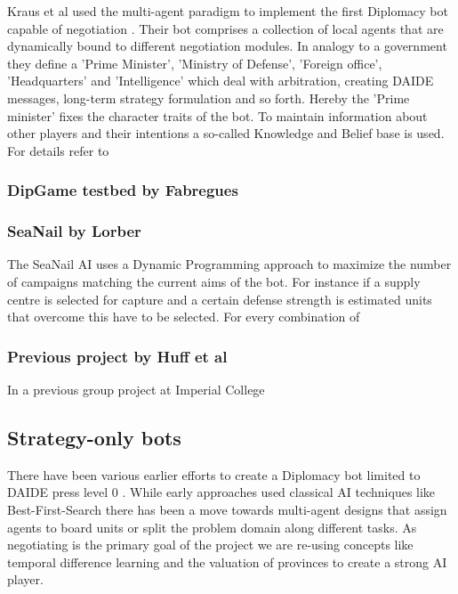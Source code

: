 \documentclass[11pt]{article} \usepackage{fullpage} \usepackage{cite}
\begin{document}
Kraus et al used the multi-agent paradigm to implement the first Diplomacy bot
capable of negotiation \cite{Kraus95}. Their bot comprises a collection of local
agents that are dynamically bound to different negotiation modules. In analogy
to a government they define a 'Prime Minister', 'Ministry of Defense', 'Foreign
office', 'Headquarters' and 'Intelligence' which deal with arbitration, creating
DAIDE messages, long-term strategy formulation and so forth. Hereby the 'Prime
minister' fixes the character traits of the bot. To maintain information about
other players and their intentions a so-called Knowledge and Belief base is
used. For details refer to \cite{Kraus88}

\subsubsection{DipGame testbed by Fabregues}

\subsubsection{SeaNail by Lorber}

The SeaNail AI \cite{Lorber98} uses a Dynamic Programming approach to maximize
the number of campaigns matching the current aims of the bot. For instance if a
supply centre is selected for capture and a certain defense strength is
estimated units that overcome this have to be selected. For every combination of

\subsubsection{Previous project by Huff et al}

In a previous group project at Imperial College \cite{Huff05}

\subsection{Strategy-only bots}

There have been various earlier efforts to create a Diplomacy bot limited to
DAIDE press level 0 \cite{DAIDEsyntax10}. While early approaches used classical
AI techniques like Best-First-Search there has been a move towards multi-agent
designs that assign agents to board units or split the problem domain along
different tasks. As negotiating is the primary goal of the project we are
re-using concepts like temporal difference learning \cite{Levinson94}
\cite{Shapiro02} and the valuation of provinces \cite{Huff05} to create a strong
AI player.
\end{document}
